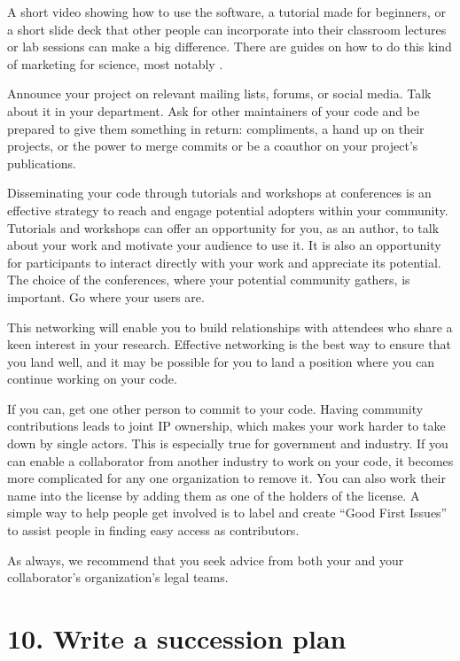 \documentclass[10pt,letterpaper]{article}
\begin{document}
A short video showing how to use the software,
a tutorial made for beginners,
or a short slide deck that other people can incorporate into their classroom lectures or lab sessions
can make a big difference.
There are guides on how to do this kind of marketing for science,
most notably \cite{Kuchner2011}.

Announce your project on relevant mailing lists, forums, or social media.
Talk about it in your department.
Ask for other maintainers of your code
and be prepared to give them something in return:
compliments,
a hand up on their projects,
or the power to merge commits or be a coauthor on your project's publications.

Disseminating your code through tutorials and workshops at conferences
is an effective strategy to reach and engage potential adopters within your community.
Tutorials and workshops can offer an opportunity for you,
as an author,
to talk about your work and motivate your audience to use it.
It is also an opportunity for participants to interact directly with your work and appreciate its potential.
The choice of the conferences, where your potential community gathers, is important.
Go where your users are.

This networking will enable you to build relationships with attendees who share a keen interest in your research.
Effective networking is the best way to ensure that you land well,
and it may be possible for you to land a position where you can continue working on your code.

If you can, get one other person to commit to your code.
Having community contributions leads to joint IP ownership,
which makes your work harder to take down by single actors.
This is especially true for government and industry.
If you can enable a collaborator from another industry to work on your code,
it becomes more complicated for any one organization to remove it.
You can also work their name into the license
by adding them as one of the holders of the license.
A simple way to help people get involved is to label and create ``Good First Issues''
to assist people in finding easy access as contributors.

As always,
we recommend that you seek advice from both your and your collaborator's organization's legal teams.

\section*{10. Write a succession plan}
\end{document}
